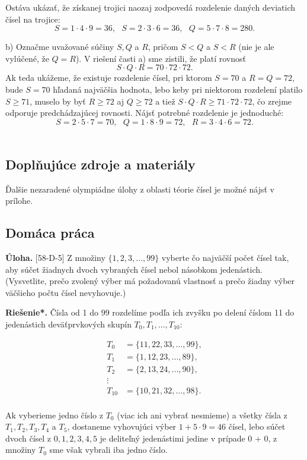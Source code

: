 \documentclass[11pt,a4paper,oneside,final]{book}
\newcommand{\ul}{\textbf{Úloha.} }
\newcommand{\rieh}{\textbf{Riešenie*.} }
\begin{document}
Ostáva ukázať, že získanej trojici naozaj zodpovedá rozdelenie daných deviatich čísel na trojice:
$$S = 1 \cdot 4 \cdot 9 = 36, \ \ \ S = 2 \cdot 3 \cdot 6 = 36, \ \ \ Q = 5 \cdot 7 \cdot 8 = 280.$$

b) Označme uvažované súčiny $S, Q$ a $R$, pričom $S < Q$ a $S < R$ (nie je ale vylúčené, že $Q = R$). V riešení časti a) sme zistili, že platí rovnosť
$$S \cdot Q \cdot R = 70 \cdot 72 \cdot 72.$$
Ak teda ukážeme, že existuje rozdelenie čísel, pri ktorom $S = 70$ a $R = Q = 72$, bude $S = 70$ hľadaná najväčšia hodnota, lebo keby pri niektorom rozdelení platilo $S \geq 71$, muselo by byť $R \geq 72$ aj $Q \geq 72$ a tiež $S \cdot Q \cdot R \geq 71 \cdot 72 \cdot 72$, čo zrejme odporuje predchádzajúcej rovnosti. Nájsť potrebné rozdelenie je jednoduché:
$$ S = 2 \cdot 5 \cdot 7 = 70, \ \ \ Q = 1 \cdot 8 \cdot 9 = 72, \ \ \  R = 3 \cdot 4 \cdot 6 = 72.$$ \\

\subsection*{Doplňujúce zdroje a materiály}
Ďalšie nezaradené olympiádne úlohy z oblasti téorie čísel je možné nájsť v prílohe.

\subsection*{Domáca práca}
\begin{tcolorbox}[breakable,notitle,boxrule=0pt,colback=light-gray,colframe=light-gray]\ul [58-D-5] Z množiny $\{1, 2, 3, \ldots, 99\}$ vyberte čo najväčší počet čísel tak, aby súčet žiadnych dvoch vybraných čísel nebol násobkom jedenástich. (Vysvetlite, prečo zvolený výber má požadovanú vlastnosť a prečo žiadny výber väčšieho počtu čísel nevyhovuje.)

\end{tcolorbox}

\rieh Čísla od 1 do 99 rozdelíme podľa ich zvyšku po delení číslom 11 do jedenástich deväťprvkových skupín $T_0, T_1 ,\ldots, T_{10}$:
\begin{center}
\begin{align*}
T_0 &= \{11, 22, 33, . . . , 99\},\\
T_1 &= \{1, 12, 23, . . . , 89\},\\
T_2 &= \{2, 13, 24, . . . , 90\},\\
\vdots\\
T_{10} &= \{10, 21, 32, . . . , 98\}.\\
\end{align*}
\end{center}
Ak vyberieme jedno číslo z $T_0$ (viac ich ani vybrať nesmieme) a všetky čísla z $T_1, T_2, T_3, T_4$ a $T_5$, dostaneme vyhovujúci výber $1 + 5 \cdot 9 = 46$ čísel, lebo súčet dvoch čísel z $0, 1, 2, 3, 4, 5$ je deliteľný jedenástimi jedine v prípade 0 + 0, z množiny $T_0$ sme však vybrali iba jedno číslo.
\end{document}
